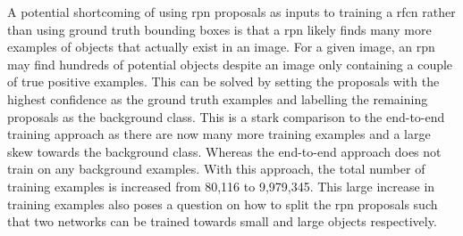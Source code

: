 A potential shortcoming of using \gls{rpn} proposals as inputs to training a \gls{rfcn} rather than using ground truth bounding boxes is that a \gls{rpn} likely finds many more examples of objects that actually exist in an image. For a given image, an \gls{rpn} may find hundreds of potential objects despite an image only containing a couple of true positive examples. This can be solved by setting the proposals with the highest confidence as the ground truth examples and labelling the remaining proposals as the background class. This is a stark comparison to the end-to-end training approach as there are now many more training examples and a large skew towards the background class. Whereas the end-to-end approach does not train on any background examples. With this approach, the total number of training examples is increased from 80,116 to 9,979,345. This large increase in training examples also poses a question on how to split the \gls{rpn} proposals such that two networks can be trained towards small and large objects respectively.
